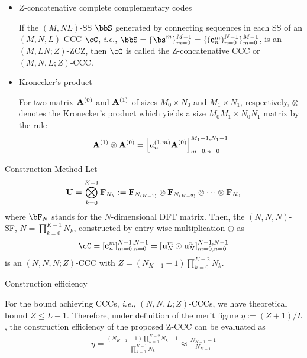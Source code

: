 \documentclass[dvipdfmx]{beamer}
\renewcommand{\maketitle}{%
  \vspace*{1ex}%
  \begin{center}%
    \Huge\inserttitle\\%
    \LARGE\insertauthor\\%
    \Large\insertinstitute%
  \end{center}%
  \vspace*{-1ex}%
}
\begin{document}
\begin{frame}{\maketitle}
\begin{columns}
\begin{column}{.45\textwidth}
\begin{definition}
\begin{itemize}
\item $Z$-concatenative complete complementary codes

If the $(M,NL)$-SS $\bbS$ generated by connecting sequences in each SS of an $(M,N,L)$-CCC $\cC$, {\it i.e.}, $\bbS = \{\bs^m\}_{m=0}^{M-1} = \{({\bf c}_n^m)_{n=0}^{N-1}\}_{m=0}^{M-1}$,  is an $(M,LN;Z)$-ZCZ, then $\cC$ is called the Z-concatenative CCC or $(M,N,L;Z)$-CCC. 
      
      \item Kronecker's product
      
      For two matrix ${\bf A}^{(0)}$ and ${\bf A}^{(1)}$ of sizes $M_0\times N_0$ and $M_1 \times N_1$, respectively, $\otimes$ denotes the Kronecker's product which yields a size $M_0M_1 \times N_0N_1$ matrix by the rule
\begin{eqnarray*}
{\bf A}^{(1)}\otimes {\bf A}^{(0)} = \left[a^{(1,m)}_{n}{\bf A}^{(0)}\right]_{m=0,n=0}^{M_1-1,N_1-1}
\end{eqnarray*}
      \end{itemize}
      \end{definition}
       \vspace*{1ex}
       
      \begin{block}{Construction Method}
      Let
\begin{eqnarray*}
{\bf U}=\bigotimes_{k=0}^{K-1}{\bf F}_{N_k} :={\bf F}_{N_{(K-1)}}\otimes {\bf F}_{N_{(K-2)}}\otimes \cdots \otimes {\bf F}_{N_0}
\end{eqnarray*}
where $\bF_N$ stands for the $N$-dimensional DFT matrix.
      Then, the $(N,N,N)$-SF, $N = \prod_{k=0}^{K-1}N_k$, constructed by entry-wise multiplication $\odot$ as
\begin{eqnarray*}
\cC = [{\bf c}_n^m]_{m=0,n=0}^{N-1,N-1} = [{\bf u}_N^m\odot{\bf u}_N^n]_{m=0,n=0}^{N-1,N-1}
\label{CCCC}
\end{eqnarray*}
is an $(N,N,N;Z)$-CCC with $Z = (N_{K-1}-1)\prod_{k=0}^{K-2}N_k$.
      \end{block}
       \vspace*{1ex}
      
            \begin{block}{Construction efficiency}


For the bound achieving CCCs, {\it i.e.}, $(N,N,L;Z)$-CCCs, we have theoretical bound $Z \leq L-1$. Therefore, under definition of the merit figure $\eta := (Z+1)/L$, the construction efficiency of the proposed Z-CCC can be evaluated as
\begin{eqnarray*}
\eta = \frac{(N_{K-1}-1)\prod_{k=0}^{K-2}N_k+1}{\prod_{k=0}^{K-1}N_k} \approx \frac{N_{K-1}-1}{N_{K-1}}
\label{MF}
\end{eqnarray*}


\end{block}
\end{column}
\end{columns}
\end{frame}
\end{document}
